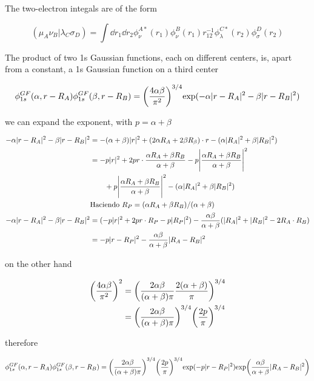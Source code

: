 \documentclass[11pt]{article}
\begin{document}
The two-electron integals are of the form

\[ (\mu_A\nu_B|\lambda_C\sigma_D) = \int \dd{r_1}\dd{r_2} \phi_{\nu}^{A * }(r_1)\phi_{\nu}^B(r_1)r_{12}^{-1}\phi_{\lambda}^{C * }(r_2)\phi_{\sigma}^D(r_2) \]

The product of two 1s Gaussian functions, each on different centers, is, apart from a constant, a 1s Gaussian function on a third center

\begin{align*}
    \phi_{1s}^{GF}(\alpha, r-R_A)\phi_{1s}^{GF}(\beta,r-R_B) = \qty(\frac{4\alpha\beta}{\pi^2})^{3/4} \text{exp}(-\alpha|r-R_A|^2 - \beta|r-R_B|^2)
\end{align*}

we can expand the exponent, with \(p=\alpha+\beta\)

\begin{align*}
    -\alpha|r-R_A|^2 - \beta|r-R_B|^2 &= -(\alpha+\beta)|r|^2 + (2\alpha R_A+2\beta R_{\beta})\cdot r - (\alpha|R_A|^2 + \beta|R_B|^2) \\
    &= -p|r|^2 + 2pr \cdot \frac{\alpha R_A+\beta R_B}{\alpha+\beta} - p \Bigg| \frac{\alpha R_A + \beta R_B}{\alpha+\beta} \Bigg|^2 \\
    & \qq{} + p\Bigg| \frac{\alpha R_A + \beta R_B}{\alpha+\beta} \Bigg|^2 - (\alpha |R_A|^2 + \beta |R_B|^2) \\
    & \text{Haciendo }  R_P = (\alpha R_A + \beta R_B)/(\alpha+\beta)  \\
    -\alpha |r-R_A|^2 - \beta|r-R_B|^2 &= (-p|r|^2 + 2pr \cdot R_P - p |R_P|^2)- \frac{\alpha\beta}{\alpha+\beta} (|R_A|^2 + |R_B|^2 - 2R_A \cdot R_B) \\
    &= - p |r-R_P|^2 - \frac{\alpha\beta}{\alpha+\beta}|R_A-R_B|^2
\end{align*}

on the other hand

\begin{align*}
    \qty(\frac{4\alpha\beta}{\pi^2})^2 &= \qty(\frac{2\alpha\beta}{(\alpha+\beta)\pi} \frac{2(\alpha+\beta)}{\pi})^{3/4} \\
    &= \qty(\frac{2\alpha\beta}{(\alpha+\beta)\pi})^{3/4}\qty(\frac{2p}{\pi})^{3/4}
\end{align*}

therefore

\[ \phi_{1s}^{GF}(\alpha,r-R_A)\phi_{1s}^{GF}(\beta,r-R_B)=\qty(\frac{2\alpha\beta}{(\alpha+\beta)\pi})^{3/4} \qty(\frac{2p}{\pi})^{3/4} \text{exp}(-p|r-R_P|^2) \text{exp}\qty(\frac{\alpha\beta}{\alpha+\beta}|R_A-R_B|^2) \]
\end{document}
